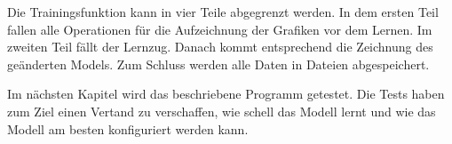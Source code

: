 Die Trainingsfunktion kann in vier Teile abgegrenzt werden. In dem ersten Teil fallen alle Operationen für die Aufzeichnung der Grafiken vor dem Lernen. Im zweiten Teil fällt der Lernzug. Danach kommt entsprechend die Zeichnung des 
geänderten Models. Zum Schluss werden alle Daten in Dateien abgespeichert.

Im nächsten Kapitel wird das beschriebene Programm getestet. Die Tests haben zum Ziel einen Vertand zu verschaffen, wie schell das Modell lernt und wie das Modell am besten konfiguriert werden kann.